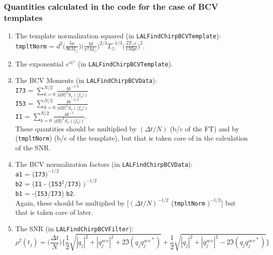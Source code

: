 \subsubsection*{Quantities calculated in the code for the case of BCV templates}

\begin{enumerate}
\item The template normalization squared (in \texttt{LALFindChirpBCVTemplate}):
	\\
\texttt{tmpltNorm} = $d^2 \Big ( \frac{5\mu}{96 M_{\odot}}\Big ) \Big ( \frac{M}        {\pi^2 M_{\odot}} \Big )^{2/3} T_{\odot}^{-1/3}  
        \Big (\frac{2 T_{\odot} c}{1 Mpc} \Big )^2.$
\item The exponential $e^{i \psi'}$ (in \texttt{LALFindChirpBCVTemplate}).
\item The BCV Moments (in \texttt{LALFindChirpBCVData}): \\
\texttt{I73} = $\sum_{k=0}^{N/2} \frac{4 k^{-7/3}}{|dR|^2 S_v(|f_k|)}$ \\
\texttt{I53} = $\sum_{k=0}^{N/2} \frac{4 k^{-5/3}}{|dR|^2 S_v(|f_k|)}$ \\
\texttt{I1} = $\sum_{k=0}^{N/2} \frac{4 k^{-1}}{|dR|^2 S_v(|f_k|)}.$ \\
These quantities should be multiplied by $(\Delta t /N)$ (b/c of the FT) and
by (\texttt{tmpltNorm}) (b/c of the template), but that is taken
care of in the calculation of the SNR.
\item The BCV normalization factors (in \texttt{LALFindChirpBCVData}):\\
\texttt{a1} = (\texttt{I73}$)^{-1/2}$ \\
\texttt{b2} = (\texttt{I1} - (\texttt{I53}${}^2$/\texttt{I73})
	$)^{-1/2}$ \\
\texttt{b1} = -(\texttt{I53}/\texttt{I73})  \texttt{b2}. \\
Again, these should be multiplied by $[(\Delta t/N)^{-1/2}$ (\texttt{tmpltNorm}
$)^{-1/2}]$ 
but that is taken care of later.
\item The SNR (in \texttt{LALFindChirpBCVFilter}):
\begin{equation}
\rho^2(t_j) = \Big ( \frac{\Delta t}{N} \Big ) \bigg \{ \frac{1}{2} 
	\sqrt{ |q_j|^2 + |q^{{}_{BCV}}_j|^2 + 2 \Im (q_j q^{{}_{BCV}\ast}_j) } +
	\frac{1}{2}\sqrt{|q_j|^2+|q^{{}_{BCV}}_j|^2 - 
	2 \Im (q_j q^{{}_{BCV} \ast}_j) }
	\bigg \} 
\end{equation}
\end{enumerate}

